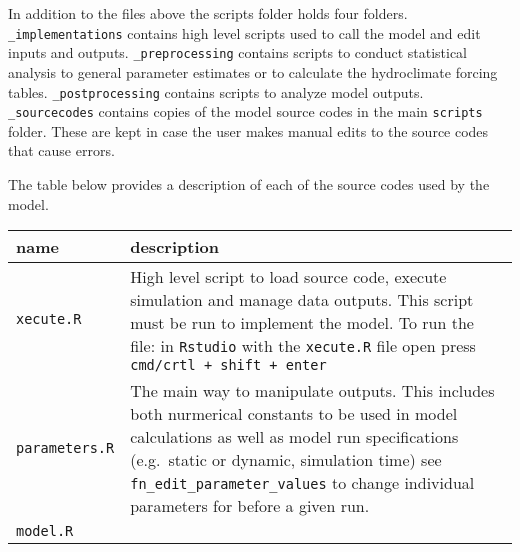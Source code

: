 \documentclass[
]{article}
\begin{document}
In addition to the files above the scripts folder holds four folders.
\texttt{\_implementations} contains high level scripts used to call the
model and edit inputs and outputs. \texttt{\_preprocessing} contains
scripts to conduct statistical analysis to general parameter estimates
or to calculate the hydroclimate forcing tables.
\texttt{\_postprocessing} contains scripts to analyze model outputs.
\texttt{\_sourcecodes} contains copies of the model source codes in the
main \texttt{scripts} folder. These are kept in case the user makes
manual edits to the source codes that cause errors.

The table below provides a description of each of the source codes used
by the model.

\begin{longtable}[]{@{}ll@{}}
\toprule
\begin{minipage}[b]{0.47\columnwidth}\raggedright
name\strut
\end{minipage} & \begin{minipage}[b]{0.47\columnwidth}\raggedright
description\strut
\end{minipage}\tabularnewline
\midrule
\endhead
\begin{minipage}[t]{0.47\columnwidth}\raggedright
\texttt{xecute.R}\strut
\end{minipage} & \begin{minipage}[t]{0.47\columnwidth}\raggedright
High level script to load source code, execute simulation and manage
data outputs. This script must be run to implement the model. To run the
file: in \texttt{Rstudio} with the \texttt{xecute.R} file open press
\texttt{cmd/crtl\ +\ shift\ +\ enter}\strut
\end{minipage}\tabularnewline
\begin{minipage}[t]{0.47\columnwidth}\raggedright
\texttt{parameters.R}\strut
\end{minipage} & \begin{minipage}[t]{0.47\columnwidth}\raggedright
The main way to manipulate outputs. This includes both nurmerical
constants to be used in model calculations as well as model run
specifications (e.g.~static or dynamic, simulation time) see
\texttt{fn\_edit\_parameter\_values} to change individual parameters for
before a given run.\strut
\end{minipage}\tabularnewline
\begin{minipage}[t]{0.47\columnwidth}\raggedright
\texttt{model.R}\strut
\end{minipage} & \begin{minipage}[t]{0.47\columnwidth}\raggedright

\end{minipage}
\end{longtable}
\end{document}
